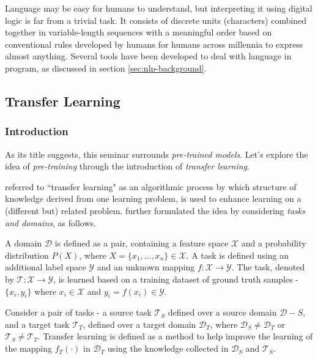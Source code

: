 \documentclass{article}
\begin{document}
\medskip
\noindent
Language may be easy for humans to understand, but interpreting it using digital logic is far from a trivial task. It consists of discrete units (characters) combined together in variable-length sequences with a meaningful order based on conventional rules developed by humans for humans across millennia to express almost anything. Several tools have been developed to deal with language in program, as discussed in section \ref{sec:nlp-background}.



\subsection{Transfer Learning}
\label{sec:transfer}

\subsubsection{Introduction}

As its title suggests, this seminar surrounds \emph{pre-trained models}. Let's explore the idea of \emph{pre-training} through the introduction of \emph{transfer learning}.

\medskip
\noindent
\citet{ventura2007theoretical} referred to ``transfer learning" as an algorithmic process by which structure of knowledge derived from one learning problem, is used to enhance learning on a (different but) related problem. \citet{lin2017transfer} further formulated the idea by considering \emph{tasks and domains}, as follows.

\medskip
\noindent
A domain $\mathcal{D}$ is defined as a pair, containing a feature space $\mathcal{X}$ and a probability distribution $P(X)$, where $X=\{x_1,...,x_n\} \in \mathcal{X}$. A task is defined using an additional label space $\mathcal{Y}$ and an unknown mapping $f:\mathcal{X} \rightarrow \mathcal{Y}$. The task, denoted by $\mathcal{T}: \mathcal{X} \rightarrow \mathcal{Y}$, is learned based on a training dataset of ground truth samples - $\{x_i,y_i\}$ where $x_i \in \mathcal{X}$ and $y_i = f(x_i) \in \mathcal{Y}$. 

\medskip
\noindent
Consider a pair of tasks - a source task $\mathcal{T}_S$ defined over a source domain $\mathcal{D}-S$, and a target task $\mathcal{T}_T$, defined over a target domain $\mathcal{D}_T$, where $\mathcal{D}_S \not= \mathcal{D}_T$ or $\mathcal{T}_S \not= \mathcal{T}_T$. Transfer learning is defined as a method to help improve the learning of the mapping $f_T(\cdot)$ in $\mathcal{D}_T$ using the knowledge collected in $\mathcal{D}_S$ and $\mathcal{T}_S$.
\end{document}
